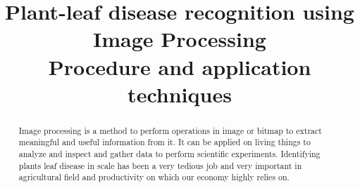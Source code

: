 \documentclass[conference]{IEEEtran}
\begin{document}
\title{ Plant-leaf disease recognition using Image Processing \\
{\footnotesize \textsuperscriptLogical Procedure and application techniques }
}

\author{
\and
\and
\and


}






\maketitle

\begin{abstract}
Image processing is a method to perform operations in image or bitmap to extract meaningful and useful information from it. It can be applied on living things to analyze and inspect and gather data to perform scientific experiments. Identifying plants leaf disease in scale has been a very tedious job and very important in agricultural field and productivity on which our economy highly relies on.
\end{abstract}

\end{document}
